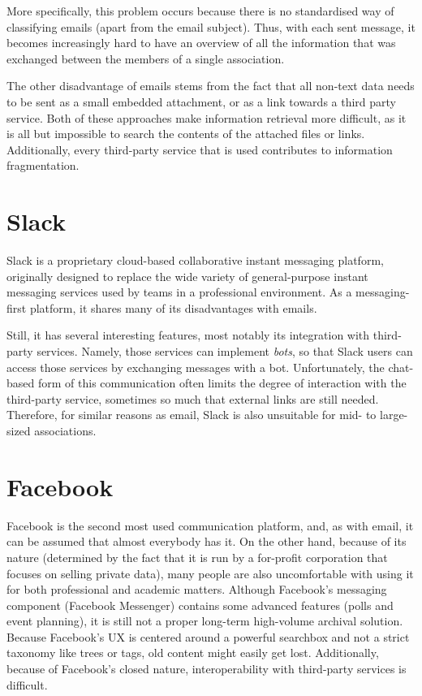 \documentclass[a4paper, english]{report}
\begin{document}
More specifically, this problem occurs because there is no standardised way of classifying emails (apart from the email subject). Thus, with each sent message, it becomes increasingly hard to have an overview of all the information that was exchanged between the members of a single association.

The other disadvantage of emails stems from the fact that all non-text data needs to be sent as a small embedded attachment, or as a link towards a third party service. Both of these approaches make information retrieval more difficult, as it is all but impossible to search the contents of the attached files or links. Additionally, every third-party service that is used contributes to information fragmentation.

\section{Slack}
Slack is a proprietary cloud-based collaborative instant messaging platform, originally designed to replace the wide variety of general-purpose instant messaging services used by teams in a professional environment. As a messaging-first platform, it shares many of its disadvantages with emails. 

Still, it has several interesting features, most notably its integration with third-party services. Namely, those services can implement \emph{bots}, so that Slack users can access those services by exchanging messages with a bot. Unfortunately, the chat-based form of this communication often limits the degree of interaction with the third-party service, sometimes so much that external links are still needed. Therefore, for similar reasons as email, Slack is also unsuitable for mid- to large-sized associations.

\section{Facebook}
Facebook is the second most used communication platform, and, as with email, it can be assumed that almost everybody has it. On the other hand, because of its nature (determined by the fact that it is run by a for-profit corporation that focuses on selling private data), many people are also uncomfortable with using it for both professional and academic matters. Although Facebook's messaging component (Facebook Messenger) contains some advanced features (polls and event planning), it is still not a proper long-term high-volume archival solution. Because Facebook's UX is centered around a powerful searchbox and not a strict taxonomy like trees or tags, old content might easily get lost. Additionally, because of Facebook's closed nature, interoperability with third-party services is difficult.
\end{document}
